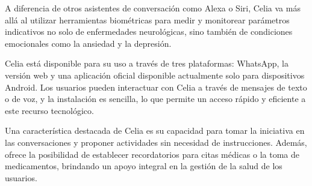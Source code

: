 A diferencia de otros asistentes de conversación como Alexa o Siri, Celia va más allá al utilizar herramientas biométricas para medir y monitorear parámetros indicativos no solo de enfermedades neurológicas, sino también de condiciones emocionales como la ansiedad y la depresión.

Celia está disponible para su uso a través de tres plataformas: WhatsApp, la versión web y una aplicación oficial disponible actualmente solo para dispositivos Android. Los usuarios pueden interactuar con Celia a través de mensajes de texto o de voz, y la instalación es sencilla, lo que permite un acceso rápido y eficiente a este recurso tecnológico.

Una característica destacada de Celia es su capacidad para tomar la iniciativa en las conversaciones y proponer actividades sin necesidad de instrucciones. Además, ofrece la posibilidad de establecer recordatorios para citas médicas o la toma de medicamentos, brindando un apoyo integral en la gestión de la salud de los usuarios.
